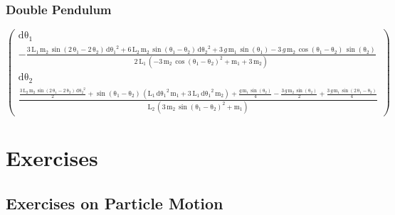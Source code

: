 \documentclass[graybox,envcountchap,sectrefs]{svmonoMuga}
\begin{document}
\subsection{Double Pendulum}
\[
\left(\begin{array}{c} \mathrm{d\theta_1}\\ -\frac{3\, \mathrm{L_1}\, \mathrm{m_2}\, \sin\!\left(2\, \mathrm{\theta_1} - 2\, \mathrm{\theta_2}\right)\, {\mathrm{d\theta_1}}^2 + 6\, \mathrm{L_2}\, \mathrm{m_2}\, \sin\!\left(\mathrm{\theta_1} - \mathrm{\theta_2}\right)\, {\mathrm{d\theta_2}}^2 + 3\, g\, \mathrm{m_1}\, \sin\!\left(\mathrm{\theta_1}\right) - 3\, g\, \mathrm{m_2}\, \cos\!\left(\mathrm{\theta_1} - \mathrm{\theta_2}\right)\, \sin\!\left(\mathrm{\theta_2}\right)}{2\, \mathrm{L_1}\, \left( - 3\, \mathrm{m_2}\, {\cos\!\left(\mathrm{\theta_1} - \mathrm{\theta_2}\right)}^2 + \mathrm{m_1} + 3\, \mathrm{m_2}\right)}\\ \mathrm{d\theta_2}\\ \frac{\frac{3\, \mathrm{L_2}\, \mathrm{m_2}\, \sin\!\left(2\, \mathrm{\theta_1} - 2\, \mathrm{\theta_2}\right)\, {\mathrm{d\theta_2}}^2}{2} + \sin\!\left(\mathrm{\theta_1} - \mathrm{\theta_2}\right)\, \left(\mathrm{L_1}\, {\mathrm{d\theta_1}}^2\, \mathrm{m_1} + 3\, \mathrm{L_1}\, {\mathrm{d\theta_1}}^2\, \mathrm{m_2}\right) + \frac{g\, \mathrm{m_1}\, \sin\!\left(\mathrm{\theta_2}\right)}{4} - \frac{3\, g\, \mathrm{m_2}\, \sin\!\left(\mathrm{\theta_2}\right)}{2} + \frac{3\, g\, \mathrm{m_1}\, \sin\!\left(2\, \mathrm{\theta_1} - \mathrm{\theta_2}\right)}{4}}{\mathrm{L_2}\, \left(3\, \mathrm{m_2}\, {\sin\!\left(\mathrm{\theta_1} - \mathrm{\theta_2}\right)}^2 + \mathrm{m_1}\right)} \end{array}\right)
\]





\newpage
\chapter{Exercises}\label{secn:Exercises}

\section{Exercises on Particle Motion}\label{Secn:ExercisesParticleMotn}
\end{document}
